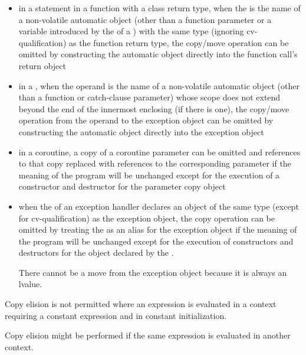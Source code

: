 \begin{itemize}
\item in a  statement in a function with a class return type,
when the  is the name of a non-volatile
automatic object (other than a function parameter or a variable
introduced by the  of a
)
with the same type (ignoring cv-qualification) as
the function return type, the copy/move operation can be
omitted by constructing the automatic object directly
into the function call's return object

\item in a , when the operand
is the name of a non-volatile automatic object
(other than a function or catch-clause parameter)
whose scope does not extend beyond the end of the innermost enclosing
 (if there is one), the copy/move operation from the
operand to the exception object can be omitted by
constructing the automatic object directly into the exception object

\item in a coroutine, a copy of a coroutine parameter
can be omitted and references to that copy replaced with references to the
corresponding parameter if the meaning of the program will be unchanged except for
the execution of a constructor and destructor for the parameter copy object

\item when the  of an
exception handler declares an object of the same
type (except for cv-qualification) as the exception
object, the copy operation can be omitted by treating
the  as an alias for the exception
object if the meaning of the program will be unchanged except for the execution
of constructors and destructors for the object declared by the
.
\begin{note}
There cannot be a move from the exception object because it is
always an lvalue.
\end{note}
\end{itemize}
Copy elision is not permitted
where an expression is evaluated in a context
requiring a constant expression
and in constant initialization.
\begin{note}
Copy elision might be performed
if the same expression
is evaluated in another context.
\end{note}

